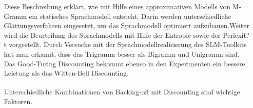 Diese Beschreibung erkl\"art, wie mit Hilfe eines approximativen Modells von M-Gramm ein statisches Sprachmodell entsteht. Darin werden unterschiedliche Gl\"attungsverfahren eingesetzt, um das Sprachmodell optimiert aufzubauen.Weiter wird die Beurteilung des Sprachmodells mit Hilfe der Entropie sowie der Perlexit?t vorgestellt.
Durch Versuche mit der Sprachmodellrealisierung des SLM-Toolkits hat man erkannt, dass das Trigramm besser als Bigramm und Unigramm sind. Das Good-Turing Discounting bekommt ebenso in den Experimenten ein bessere Leistung als das Witten-Bell Discounting. 
\\
\\
Unterschiedliche Kombinationen von Backing-off mit Discounting sind wichtige Faktoren.
